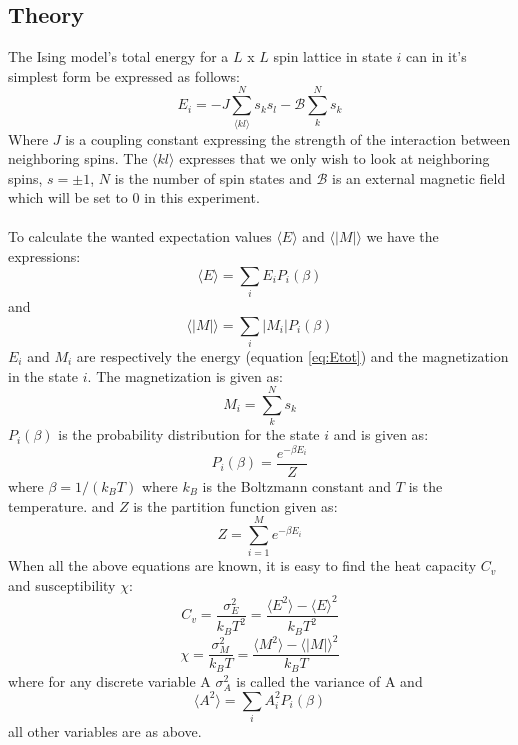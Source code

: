 \documentclass{article}
\begin{document}
\subsection*{Theory}
The Ising model's total energy for a $L$ x $L$  spin lattice in state $i$ can in it's simplest form be expressed as follows:
\begin{equation}
E_i = - J \sum\limits_{\langle kl \rangle}^N s_k s_l - \mathcal{B}\sum \limits_{k}^N s_k
\label{eq:Etot}
\end{equation}
Where $J$ is a coupling constant expressing the strength of the interaction between neighboring spins. The $\langle kl \rangle$ expresses that we only wish to look at neighboring spins, $s = \pm 1$, $N$ is the number of spin states and $\mathcal{B}$ is an external magnetic field which will be set to 0 in this experiment. \\ \\
To calculate the wanted expectation values $\langle E \rangle$ and $\langle |M| \rangle$ we have the expressions:
\begin{equation}
\langle E \rangle = \sum \limits_i E_i P_i(\beta)
\label{eq:Eexp}
\end{equation} 
and 
\begin{equation}
\langle |M| \rangle = \sum \limits_i |M_i| P_i(\beta)
\label{eq:Mexp}
\end{equation}
$E_i$ and $M_i$ are respectively the energy (equation \eqref{eq:Etot}) and the magnetization in the state $i$. The magnetization is given as:
\begin{equation}
M_i = \sum \limits_k^N s_k
\label{eq:Mtot}
\end{equation} 
$P_i(\beta)$ is the probability distribution for the state $i$ and is given as:
\begin{equation}
P_i(\beta) = \frac{e^{-\beta E_i}}{Z}
\label{eq:probdist}
\end{equation}
where $\beta = 1/(k_B T)$ where $k_B$ is the Boltzmann constant and $T$ is the temperature. and $Z$ is the partition function given as:
\begin{equation}
Z = \sum \limits_{i = 1}^M e^{- \beta E_i}
\label{eq:distribution}
\end{equation}
When all the above equations are known, it is easy to find the heat capacity $C_v$ and susceptibility $\chi$:
\begin{equation}
C_v = \frac{\sigma_E^2}{k_B T^2} = \frac{\langle E^2 \rangle - \langle E \rangle ^2}{k_B T^2}
\label{eq:heatc}
\end{equation}
\begin{equation}
\chi = \frac{\sigma_M^2}{k_B T} = \frac{\langle M^2 \rangle - \langle |M| \rangle ^2}{k_B T}
\label{eq:suscept}
\end{equation}
where for any discrete variable A $\sigma_A^2$ is called the variance of A and
\begin{equation}
\langle A^2 \rangle = \sum_i A_i^2 P_i(\beta)
\label{eq:var}
\end{equation}
all other variables are as above.
\end{document}
